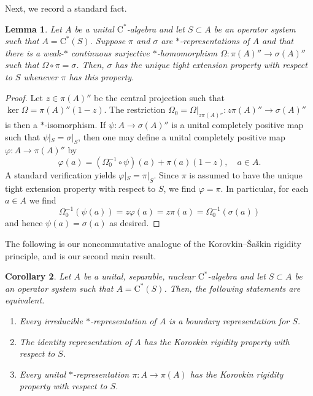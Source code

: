 \documentclass[10pt]{amsart}
\newcommand{\rC}{\mathrm{C}}
\renewcommand{\phi}{\varphi}
\newtheorem{lemma}{Lemma}[section]
\newtheorem{corollary}[lemma]{Corollary}
\theoremstyle{definition}
\begin{document}
Next,  we record a standard fact.

\begin{lemma}\label{L:reptrick}
Let $A$ be a unital $\rC^*$-algebra and let $S\subset A$ be an operator system such that $A=\rC^*(S)$. Suppose $\pi$ and $\sigma$ are $*$-representations of $A$ and that there is a weak-$*$ continuous surjective $*$-homomorphism $\Omega:\pi(A)''\to \sigma(A)''$ such that $\Omega\circ \pi=\sigma$. Then, $\sigma$ has the unique tight extension property with respect to $S$ whenever $\pi$ has this property.
\end{lemma}

\begin{proof}
Let $z\in \pi(A)''$ be the central projection such that $\ker \Omega=\pi(A)''(1-z)$. The restriction $\Omega_0=\Omega|_{z \pi(A)''}: z\pi(A)''\to \sigma(A)''$ is then a $*$-isomorphism. If $\psi:A\to \sigma(A)''$ is a unital completely positive map such that $\psi|_S=\sigma|_S$, then one may define a unital completely positive map $\phi:A\to \pi(A)''$ by
\[
\phi(a)=(\Omega_0^{-1}\circ \psi)(a)+ \pi(a)(1-z), \quad a\in A.
\]
A standard verification yields $\varphi|_S = \pi|_S$. Since $\pi$ is assumed to have the unique tight extension property with respect to $S$, we find $\phi=\pi$. In particular, for each $a\in A$ we find
\[
\Omega_0^{-1}(\psi(a))=z\phi(a)=z\pi(a)=\Omega_0^{-1}(\sigma(a))
\]
and hence $\psi(a)=\sigma(a)$ as desired.
\end{proof}

The following is our noncommutative analogue of the Korovkin--\v Sa\v skin rigidity principle, and is our second main result.



\begin{corollary}\label{C:nuclearrigprinc}
Let $A$ be a unital, separable, nuclear $\rC^*$-algebra and let $S\subset A$ be an operator system such that $A=\rC^*(S)$. Then, the following statements are equivalent.
\begin{enumerate}[{\rm (i)}]
\item Every irreducible $*$-representation of $A$ is a boundary representation for $S$.
\item The identity representation of $A$ has the  Korovkin rigidity property with respect to $S$.
\item Every unital $*$-representation $\pi:A\to \pi(A)$ has the Korovkin rigidity property with respect to $S$.
\end{enumerate}
\end{corollary}
\end{document}
